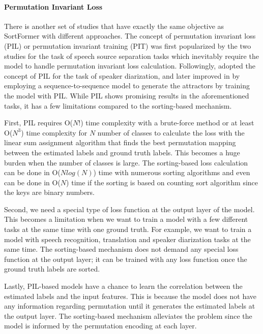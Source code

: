 \documentclass{article}
\begin{document}
\paragraph{Permutation Invariant Loss}

There is another set of studies that have exactly the same objective as SortFormer with different approaches.
The concept of permutation invariant loss (PIL) or permutation invariant training (PIT) was first popularized by the two studies \cite{kolbaek2017multitalker, yu2017permutation}
for the task of speech source separation tasks which inevitably require the model to handle permutation invariant loss calculation.
Followingly, \cite{fujita2019end} adopted the concept of PIL for the task of speaker diarization, and later improved in \cite{horiguchi2022encoder} by
employing a sequence-to-sequence model to generate the attractors by training the model with PIL. While PIL shows promising results in the aforementioned tasks,
it has a few limitations compared to the sorting-based mechanism.

First, PIL requires O($N!$) time complexity with a brute-force method
or at least O($N^3$) time complexity for $N$ number of classes
to calculate the loss with the linear sum assignment algorithm that finds
the best permutation mapping between the estimated labels and ground truth labels.
This becomes a huge burden when the number of classes is large.
The sorting-based loss calculation can be done in O($Nlog(N)$) time with numerous sorting algorithms and
even can be done in O($N$) time if the sorting is based on counting sort algorithm since the keys are binary numbers.

Second, we need a special type of loss function at the output layer of the model.
This becomes a limitation when we want to train a model with a few different tasks at the same time with one ground truth.
For example, we want to train a model with speech recognition, translation and speaker diarization tasks at the same time.
The sorting-based mechanism does not demand any special loss function at the output layer; it can be trained with any loss function once the
ground truth labels are sorted.

Lastly, PIL-based models have a chance to learn the correlation between the estimated labels and the input features.
This is because the model does not have any information regarding permutation until it generates the estimated labels at the output layer.
The sorting-based mechanism alleviates the problem since the model is informed by the permutation encoding at each layer.
\end{document}
